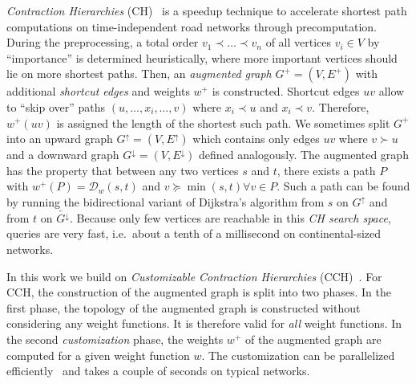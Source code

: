 \documentclass[a4paper,UKenglish,cleveref, autoref, thm-restate,anonymous]{lipics-v2021}
\newcommand*{\dist}{\mathcal{D}}
\newcommand*{\gchu}{G^{\uparrow}}
\newcommand*{\gchd}{\overleftarrow{G^{\downarrow}}}
\newcommand*{\echu}{E^{\uparrow}}
\begin{document}

\emph{Contraction Hierarchies} (CH)~\cite{gssv-erlrn-12} is a speedup technique to accelerate shortest path computations on time-independent road networks through precomputation.
During the preprocessing, a total order $v_1 \prec \dots \prec v_n$ of all vertices $v_i \in V$ by ``importance'' is determined heuristically, where more important vertices should lie on more shortest paths.
Then, an \emph{augmented graph} $G^+ = (V, E^+)$ with additional \emph{shortcut edges} and weights $w^+$ is constructed.
Shortcut edges $uv$ allow to ``skip over'' paths $(u,\dots,x_i,\dots,v)$ where $x_i \prec u$ and $x_i \prec v$.
Therefore, $w^+(uv)$ is assigned the length of the shortest such path.
We sometimes split $G^+$ into an upward graph $\gchu = (V, \echu)$ which contains only edges $uv$ where $v \succ u$ and a downward graph $G^{\downarrow} = (V, E^{\downarrow})$ defined analogously.
The augmented graph has the property that between any two vertices $s$ and $t$, there exists a path $P$ with $w^+(P) = \dist_w(s,t)$ and $v \succeq \min(s, t) \forall v \in P$.
Such a path can be found by running the bidirectional variant of Dijkstra's algorithm from $s$ on $\gchu$ and from $t$ on $\gchd$.
Because only few vertices are reachable in this \emph{CH search space}, queries are very fast, i.e.\ about a tenth of a millisecond on continental-sized networks.

In this work we build on \emph{Customizable Contraction Hierarchies} (CCH)~\cite{dsw-cch-15}.
For CCH, the construction of the augmented graph is split into two phases.
In the first phase, the topology of the augmented graph is constructed without considering any weight functions.
It is therefore valid for \emph{all} weight functions.
In the second \emph{customization} phase, the weights $w^+$ of the augmented graph are computed for a given weight function $w$.
The customization can be parallelized efficiently~\cite{bsw-rttau-19} and takes a couple of seconds on typical networks.

\end{document}
